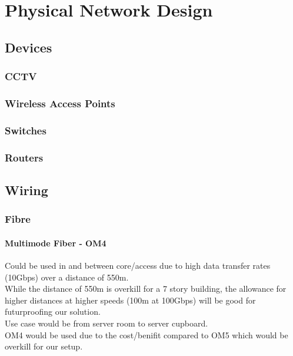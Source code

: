 \chapter{Physical Network Design}

\section{Devices}
\subsection{CCTV}
\subsection{Wireless Access Points}
\subsection{Switches}
\subsection{Routers}
\subsection{}
\section{Wiring}
\subsection{Fibre}
\subsubsection{Multimode Fiber - OM4}
Could be used in and between core/access due to high data transfer rates (10Gbps) over a distance of 550m.\\
While the distance of 550m is overkill for a 7 story building, the allowance for higher distances at higher speeds (100m at 100Gbps) will be good for futurproofing our solution.\\
Use case would be from server room to server cupboard.\\
OM4 would be used due to the cost/benifit compared to OM5 which would be overkill for our setup.\\

